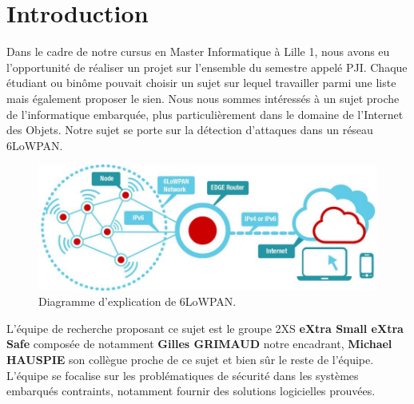 \chapter*{Introduction}
\label{chap:introduction}

Dans le cadre de notre cursus en Master Informatique à Lille 1, nous avons eu l’opportunité de réaliser un projet sur l’ensemble du semestre appelé PJI. Chaque étudiant ou binôme pouvait choisir un sujet sur lequel travailler parmi une liste mais également proposer le sien.
Nous nous sommes intéressés à un sujet proche de l'informatique embarquée, plus particulièrement dans le domaine de l'Internet des Objets. Notre sujet se porte sur la détection d'attaques dans un réseau 6LoWPAN.

\begin{figure}[htp]
	\centering
	\includegraphics[width=16cm]{images/6lowpan.jpg}
	\caption{Diagramme d'explication de 6LoWPAN.}
	\label{fig:diagramme-6lowpan}
\end{figure}
L'équipe de recherche proposant ce sujet est le groupe 2XS \textbf{eXtra Small eXtra Safe} composée de notamment \textbf{Gilles GRIMAUD} notre encadrant, \textbf{Michael HAUSPIE} son collègue proche de ce sujet et bien sûr le reste de l'équipe.
L'équipe se focalise sur les problématiques de sécurité dans les systèmes embarqués contraints, notamment fournir des solutions logicielles prouvées.


